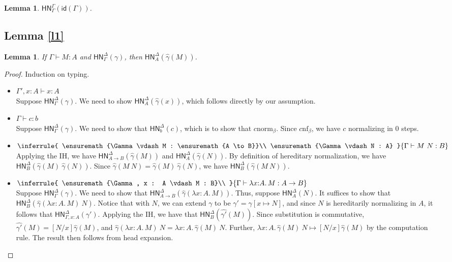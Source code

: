 \documentclass{article}
\newtheorem{lem}[thm]{Lemma}
\newtheorem*{lemm}{Lemma}
\newcommand{\hasEF}[3]{\ensuremath{#1 \vdash #2 : #3}}
\newcommand{\bnf}[1]{#1 \mathrel{\text{nf}_\beta}}
\newcommand{\bnorm}[1]{#1 \mathrel{\text{norm}_\beta}}
\newcommand{\hnorm}[3]{\ensuremath{\mathsf{HN}^{#1}_{#2}(#3)}}
\newcommand{\id}[1]{\ensuremath{\mathsf{id}(#1)}}
\newcommand{\step}[2]{\ensuremath{#1 \mapsto #2}}
\newcommand{\fn}[2]{\ensuremath{#1 \to #2}}
\newcommand{\ap}[2]{\ensuremath{#1\ #2}}
\newcommand{\lam}[3]{\ensuremath{\lambda #1 {:} #2.\, #3}}
\begin{document}
\begin{lem}\label{l3}
$\hnorm{\Gamma}{\Gamma}{\id{\Gamma}}$.
\end{lem}

\subsection{Lemma \ref{l1}}

\begin{lemm}
If $\hasEF{\Gamma}{M}{A}$ and $\hnorm{\Delta}{\Gamma}{\gamma}$, then $\hnorm{\Delta}{A}{\hat\gamma(M)}$.
\end{lemm}

\begin{proof}
Induction on typing. 
\begin{itemize}
  \setlength\itemsep{1em}
  \item $\hasEF{\Gamma', x : A}{x}{A}$\\
    Suppose $\hnorm{\Delta}{\Gamma}{\gamma}$. 
    We need to  show $\hnorm{\Delta}{A}{\hat{\gamma}(x)}$, which follows directly by our assumption.
  \item $\hasEF{\Gamma}{c}{b}$\\
    Suppose $\hnorm{\Delta}{\Gamma}{\gamma}$. We need to show that $\hnorm{\Delta}{b}{c}$, which is to 
    show that $\bnorm{c}$. Since $\bnf{c}$, we have $c$ normalizing in 0 steps. 
  \item $\inferrule{
      \hasEF{\Gamma}{M}{\fn{A}{B}}\\
      \hasEF{\Gamma}{N}{A}
    }{\hasEF{\Gamma}{\ap{M}{N}}{B}}$\\
    Applying the IH, we have $\hnorm{\Delta}{\fn{A}{B}}{\hat{\gamma}(M)}$
    and $\hnorm{\Delta}{A}{\hat{\gamma}(N)}$. By definition of hereditary normalization, we have
    $\hnorm{\Delta}{B}{\ap{\hat{\gamma}(M)}{\hat{\gamma}(N)}}$. Since $\hat{\gamma}(\ap{M}{N}) = 
    \ap{\hat{\gamma}(M)}{\hat{\gamma}(N)}$, we have
    $\hnorm{\Delta}{B}{\hat{\gamma}(\ap{M}{N})}$.
  \item
    $\inferrule{
      \hasEF{\Gamma, x : A}{M}{B}\\
    }{\hasEF{\Gamma}{\lam{x}{A}{M}}{\fn{A}{B}}}$\\
    Suppose $\hnorm{\Delta}{\Gamma}{\gamma}$. We need to show that 
    $\hnorm{\Delta}{\fn{A}{B}}{\hat{\gamma}(\lam{x}{A}{M})}$. 
    Thus, suppose $\hnorm{\Delta}{A}{N}$. It suffices to show that 
    $\hnorm{\Delta}{B}{\ap{\hat{\gamma}(\lam{x}{A}{M})}{N}}$. Notice that with $N$, we can extend $\gamma$ to be
    $\gamma' = \gamma[x \mapsto N]$, and since $N$ is hereditarily normalizing in $A$, it follows that 
    $\hnorm{\Delta}{\Gamma,x : A}{\gamma'}$. Applying the IH, we have that $\hnorm{\Delta}{B}{\hat{\gamma'}(M)}$. 
    Since substitution is commutative, $\hat{\gamma'}(M) = [N/x]\hat{\gamma}(M)$, and 
    $\ap{\hat{\gamma}(\lam{x}{A}{M})}{N} = \ap{\lam{x}{A}{\hat{\gamma}(M)}}{N}$. Further, 
    $\step{\ap{\lam{x}{A}{\hat{\gamma}(M)}}{N}}{[N/x]\hat{\gamma}(M)}$ by the computation rule. The result then follows
    from head expansion. 
   \qedhere
\end{itemize}
\end{proof}
\end{document}
